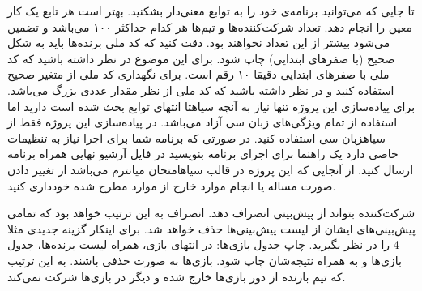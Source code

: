 \documentclass[../main.tex]{subfiles}
\begin{document}
     تا جایی که می‌توانید برنامه‌ی خود را به توابع معنی‌دار بشکنید. بهتر است هر تابع یک کار معین را انجام دهد.
     تعداد شرکت‌کننده‌ها و تیم‌ها هر کدام حداکثر ۱۰۰ می‌باشد و تضمین می‌شود بیشتر از این تعداد نخواهند بود.
     دقت کنید که کد ملی برنده‌ها باید به شکل صحیح (با صفرهای ابتدایی) چاپ شود. برای این موضوع در نظر داشته باشید که کد ملی با صفرهای ابتدایی دقیقا ۱۰ رقم است.
     برای نگهداری کد ملی از متغیر صحیح استفاده کنید و در نظر داشته باشید که کد ملی از نظر مقدار عددی بزرگ می‌باشد.
     برای پیاده‌سازی این پروژه تنها نیاز به آنچه ‌سیاه{تا انتهای توابع} بحث شده است دارید اما استفاده از تمام ویژگی‌های زبان سی آزاد می‌باشد.
     در پیاده‌سازی این پروژه فقط از ‌سیاه{زبان سی} استفاده کنید. در صورتی که برنامه شما برای اجرا نیاز به تنظیمات خاصی دارد یک راهنما برای اجرای برنامه بنویسید در فایل آرشیو نهایی همراه برنامه ارسال کنید.
     از آنجایی که این پروژه در قالب ‌سیاه{امتحان میانترم} می‌باشد از تغییر دادن صورت مساله یا انجام موارد خارج از موارد مطرح شده خودداری کنید.


     شرکت‌کننده بتواند از پیش‌بینی انصراف دهد. انصراف به این ترتیب خواهد بود که تمامی پیش‌بینی‌های ایشان از لیست پیش‌بینی‌ها حذف خواهد شد. برای اینکار گزینه جدیدی مثلا 4 را در نظر بگیرید.
     چاپ جدول بازی‌ها: در انتهای بازی، همراه لیست برنده‌ها، جدول بازی‌ها و به همراه نتیجه‌شان چاپ شود.
     بازی‌ها به صورت حذفی باشند. به این ترتیب که تیم بازنده از دور بازی‌ها خارج شده و دیگر در بازی‌ها شرکت نمی‌کند.
\end{document}
